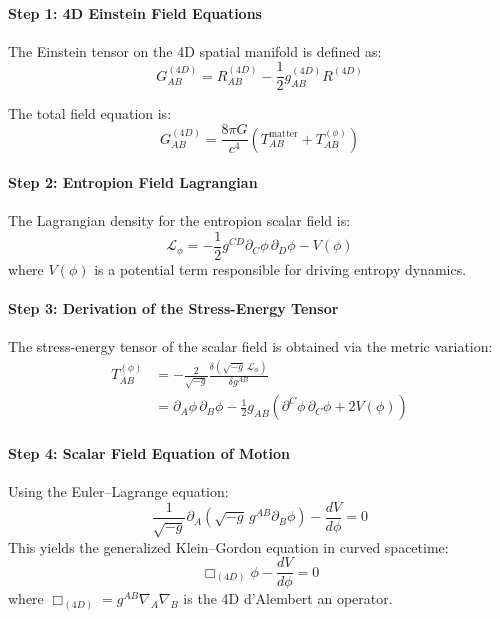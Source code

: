 \documentclass[12pt]{article}
\begin{document}
\paragraph{Step 1: 4D Einstein Field Equations}

The Einstein tensor on the 4D spatial manifold is defined as:
\begin{equation}
G^{(4D)}_{AB} = R^{(4D)}_{AB} - \frac{1}{2} g^{(4D)}_{AB} R^{(4D)}
\label{eq:A7_EinsteinTensor}
\end{equation}

The total field equation is:
\begin{equation}
G^{(4D)}_{AB} = \frac{8\pi G}{c^4} \left( T^{\text{matter}}_{AB} + T^{(\phi)}_{AB} \right)
\label{eq:A7_ModifiedEinstein}
\end{equation}

\paragraph{Step 2: Entropion Field Lagrangian}

The Lagrangian density for the entropion scalar field is:
\begin{equation}
\mathcal{L}_\phi = -\frac{1}{2} g^{CD} \partial_C \phi\, \partial_D \phi - V(\phi)
\label{eq:A7_Lagrangian}
\end{equation}
where \(V(\phi)\) is a potential term responsible for driving entropy dynamics.

\paragraph{Step 3: Derivation of the Stress-Energy Tensor}

The stress-energy tensor of the scalar field is obtained via the metric variation:
\begin{align}
T^{(\phi)}_{AB} &= -\frac{2}{\sqrt{-g}} \frac{\delta (\sqrt{-g}\, \mathcal{L}_\phi)}{\delta g^{AB}} \nonumber \\
&= \partial_A \phi\, \partial_B \phi - \frac{1}{2} g_{AB} \left( \partial^C \phi\, \partial_C \phi + 2V(\phi) \right)
\label{eq:A7_StressEnergy}
\end{align}

\paragraph{Step 4: Scalar Field Equation of Motion}

Using the Euler–Lagrange equation:
\begin{equation}
\frac{1}{\sqrt{-g}} \partial_A \left( \sqrt{-g} \, g^{AB} \partial_B \phi \right) - \frac{dV}{d\phi} = 0
\end{equation}
This yields the generalized Klein–Gordon equation in curved spacetime:
\begin{equation}
\Box_{(4D)} \phi - \frac{dV}{d\phi} = 0
\label{eq:A7_KG}
\end{equation}
where \(\Box_{(4D)} = g^{AB} \nabla_A \nabla_B\) is the 4D d’Alembert an operator.
\end{document}
